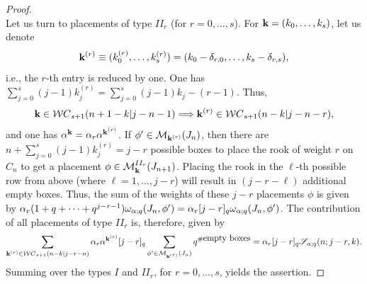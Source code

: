 \documentclass[10pt]{amsart}
\begin{document}
\begin{proof}
$$$$
Let us turn to placements of type $II_r$ (for $r=0,\ldots,s$). For ${\bf k}=(k_0,\ldots,k_s)$, let us denote 
$$
{\bf k}^{(r)}\equiv (k_0^{(r)},\ldots,k_{s}^{(r)})=(k_0-\delta_{r,0},\ldots,k_{s}-\delta_{r,s}), 
$$
i.e., the $r$-th entry is reduced by one. One has $\sum_{j=0}^s(j-1)k_{j}^{(r)}=\sum_{j=0}^s(j-1)k_{j}-(r-1)$. Thus, 
$$
{\bf k}\in {\mathcal WC}_{s+1}(n+1-k|j-n-1) \Longrightarrow {\bf k}^{(r)}\in {\mathcal WC}_{s+1}(n-k|j-n-r),
$$
and one has ${\bf  \alpha}^{{\bf k}}=\alpha_r{\bf  \alpha}^{{\bf k}^{(r)}}$. If $\phi' \in \mathcal{M}_{{\bf k}^{(r)}}(J_{n})$, then there are $n+\sum_{j=0}^s(j-1)k_{j}^{(r)}=j-r$ possible boxes to place the rook of weight $r$ on $C_n$ to get a placement $\phi \in \mathcal{M}_{{\bf k}}^{II_r}(J_{n+1})$. Placing the rook in the $\ell$-th possible row from above (where $\ell=1,\ldots,j-r$) will result in $(j-r-\ell)$ additional empty boxes. Thus, the sum of the weights of these $j-r$ placements $\phi$ is given by $\alpha_r (1+q+\cdots+q^{j-r-1})\omega_{{\bf \alpha};q}(J_n,\phi')=\alpha_r [j-r]_q \omega_{{\bf \alpha};q}(J_n,\phi')$. The contribution of all placements of type $II_r$ is, therefore, given by
$$
\sum_{{\bf k}^{(r)} \in {\mathcal WC}_{s+1}(n-k|j-r-n)} \alpha_r {\bf  \alpha}^{{\bf k}^{(r)}}[j-r]_q 
\sum_{\phi' \in {\mathcal M}_{{\bf k}^{(r)}}(J_{n})} q^{\# \mbox{empty boxes}}=\alpha_r [j-r]_q {\mathscr S}_{{\bf \alpha};q}(n;j-r,k).
$$
Summing over the types $I$ and $II_r$, for $r=0,\ldots,s$, yields the assertion.
\end{proof}
\end{document}
